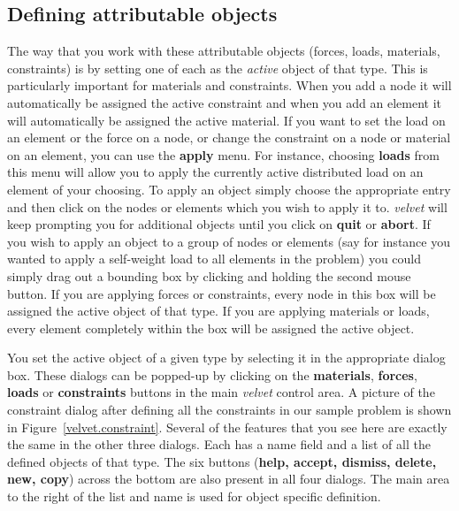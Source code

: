 \subsection{Defining attributable objects}

The way that you work with these attributable objects (forces,
loads, materials, constraints) is by setting one of each as the
{\sl active} object of that type.  This is particularly important
for materials and constraints.  When you add a node it will automatically
be assigned the active constraint and when you add an element it will
automatically be assigned the active material.  If you want to set the
load on an element or the force on a node, or change the constraint
on a node or material on an element, you can use the {\bf apply} menu.
For instance, choosing {\bf loads} from this menu will allow you to
apply the currently active distributed load on an element of your choosing.
To apply an object simply choose the appropriate entry and then click
on the nodes or elements which you wish to apply it to.  {\em velvet}
will keep prompting you for additional objects until you click on
{\bf quit} or {\bf abort}.  If you wish to apply an object to a group
of nodes or elements (say for instance you wanted to apply a self-weight
load to all elements in the problem) you could simply drag out a bounding
box by clicking and holding the second mouse button.  If you are applying
forces or constraints, every node in this box will be assigned the
active object of that type.  If you are applying materials or loads,
every element completely within the box will be assigned the active object.

You set the active object of a given type by selecting it in the 
appropriate dialog box.  These dialogs can be popped-up by clicking
on the {\bf materials}, {\bf forces}, {\bf loads} or {\bf constraints}
buttons in the main {\em velvet} control area.  A picture of the 
constraint dialog after defining all the constraints in our sample problem
is shown in Figure~\ref{velvet.constraint}.  
Several of the features that you see here are
exactly the same in the other three dialogs.  Each has a name field
and a list of all the defined objects of that type.  The
six buttons ({\bf help, accept, dismiss, delete, new, copy}) across the 
bottom are also present in all four dialogs.  The main area
to the right of the list and name is used for object specific definition.  

